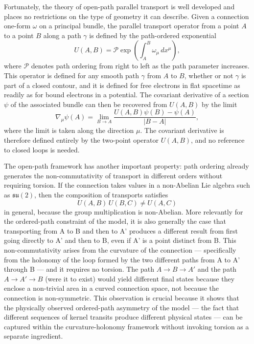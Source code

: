 \documentclass[%
 reprint,
 amsmath,amssymb,
 aps,
 prb,
]{revtex4-2}
\numberwithin{equation}{section}
\newcommand{\UAB}{U(A,B)}
\begin{document}
Fortunately, the theory of open-path parallel transport is well developed and places no restrictions on the type of geometry it can describe. Given a connection one-form $\omega$ on a principal bundle, the parallel transport operator from a point $A$ to a point $B$ along a path $\gamma$ is defined by the path-ordered exponential~\cite{nakahara}
\begin{equation}
\UAB = \mathcal{P}\exp\!\left(\int_{A}^{B} \omega_\mu\, dx^\mu\right),
\label{eq:openpath}
\end{equation}
where $\mathcal{P}$ denotes path ordering from right to left as the path parameter increases. This operator is defined for any smooth path $\gamma$ from $A$ to $B$, whether or not $\gamma$ is part of a closed contour, and it is defined for free electrons in flat spacetime as readily as for bound electrons in a potential. The covariant derivative of a section $\psi$ of the associated bundle can then be recovered from $\UAB$ by the limit
\begin{equation}
\nabla_\mu\psi(A) = \lim_{B\to A}\frac{U(A,B)\psi(B) - \psi(A)}{|B-A|},
\label{eq:covderiv}
\end{equation}
where the limit is taken along the direction $\mu$. The covariant derivative is therefore defined entirely by the two-point operator $\UAB$, and no reference to closed loops is needed.

The open-path framework has another important property: path ordering already generates the non-commutativity of transport in different orders without requiring torsion. If the connection takes values in a non-Abelian Lie algebra such as $\mathfrak{su}(2)$, then the composition of transports satisfies
\begin{equation}
U(A,B)\, U(B,C) \neq U(A,C)
\label{eq:noncommute}
\end{equation}
in general, because the group multiplication is non-Abelian. More relevantly for the ordered-path constraint of the model, it is also generally the case that transporting from A to B and then to A' produces a different result from first going directly to A' and then to B, even if A' is a point distinct from B. This non-commutativity arises from the curvature of the connection --- specifically from the holonomy of the loop formed by the two different paths from A to A' through B --- and it requires no torsion. The path $A\to B\to A'$ and the path $A\to A'\to B$ (were it to exist) would yield different final states because they enclose a non-trivial area in a curved connection space, not because the connection is non-symmetric. This observation is crucial because it shows that the physically observed ordered-path asymmetry of the model --- the fact that different sequences of kernel transits produce different physical states --- can be captured within the curvature-holonomy framework without invoking torsion as a separate ingredient.
\end{document}
